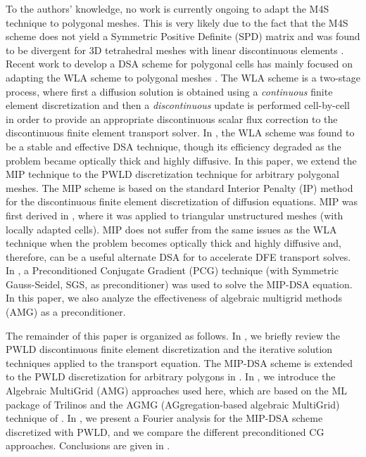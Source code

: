 To the authors' knowledge, no work is currently ongoing to adapt the M4S 
technique to polygonal meshes. This is very likely due to the fact
that the M4S scheme does not yield a Symmetric Positive Definite (SPD)
matrix and was found to be divergent for 3D tetrahedral meshes with linear 
discontinuous elements \cite{consistent_p1}. 
% 
Recent work to develop a DSA scheme for polygonal cells has mainly focused 
on adapting the WLA scheme to polygonal meshes
\cite{cfm_dfm,wla_pwl}. The WLA scheme is a two-stage process, where first a
diffusion solution is obtained using a {\em continuous} finite element
discretization and then a {\em discontinuous} update is performed cell-by-cell 
in order to provide an appropriate discontinuous scalar flux correction to 
the discontinuous finite element transport 
solver. In \cite{consistent_p1}, the WLA scheme was
found to be a stable and effective DSA technique, though its efficiency
degraded as the problem became optically thick and highly diffusive.
%
In this paper, we extend the MIP technique to the
PWLD discretization technique for arbitrary polygonal meshes.
The MIP scheme is based on the standard Interior Penalty (IP) method for the
discontinuous finite element discretization of diffusion equations. MIP was first derived in
\cite{mip}, where it was applied to triangular unstructured meshes (with
locally adapted cells). MIP does not suffer from the same issues as the WLA technique when the
problem becomes optically thick and highly diffusive and, therefore, can be a
useful alternate DSA for to accelerate DFE transport solves. 
In \cite{mip}, a Preconditioned Conjugate Gradient (PCG) technique (with Symmetric Gauss-Seidel, 
SGS, as preconditioner) was used to solve the MIP-DSA equation. In this paper, we also analyze  
the effectiveness of algebraic multigrid methods (AMG) \cite{amg,amg_course} as a preconditioner. 

The remainder of this paper is organized as follows. In ,
we briefly review the PWLD discontinuous finite element discretization 
and the iterative solution techniques applied to the 
\sn transport equation. 
The MIP-DSA scheme is extended to the PWLD discretization for arbitrary 
polygons in . In , we introduce the Algebraic MultiGrid (AMG) 
approaches used here, which are based on the ML package of Trilinos \cite{ml_guide} and the
AGMG (AGgregation-based algebraic MultiGrid) technique of 
\cite{agmg_guide,agmg,agmg2,agmg3}. In
, we present a Fourier analysis for the MIP-DSA scheme discretized with
PWLD, and we compare the different preconditioned CG approaches.
Conclusions are given in .
